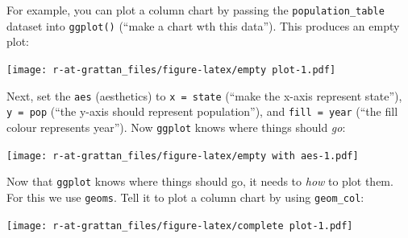 \documentclass[]{book}
\newenvironment{Shaded}{\begin{snugshade}}{\end{snugshade}}
\newcommand{\DataTypeTok}[1]{\textcolor[rgb]{0.13,0.29,0.53}{#1}}
\newcommand{\KeywordTok}[1]{\textcolor[rgb]{0.13,0.29,0.53}{\textbf{#1}}}
\newcommand{\NormalTok}[1]{#1}
\newcommand{\OperatorTok}[1]{\textcolor[rgb]{0.81,0.36,0.00}{\textbf{#1}}}
\newcommand{\StringTok}[1]{\textcolor[rgb]{0.31,0.60,0.02}{#1}}
\begin{document}
For example, you can plot a column chart by passing the \texttt{population\_table} dataset into \texttt{ggplot()} (``make a chart wth this data''). This produces an empty plot:

\begin{Shaded}
\end{Shaded}

\texttt{[image: r-at-grattan\_files/figure-latex/empty plot-1.pdf]}

Next, set the \texttt{aes} (aesthetics) to \texttt{x\ =\ state} (``make the x-axis represent state''), \texttt{y\ =\ pop} (``the y-axis should represent population''), and \texttt{fill\ =\ year} (``the fill colour represents year''). Now \texttt{ggplot} knows where things should \emph{go}:

\begin{Shaded}
\end{Shaded}

\texttt{[image: r-at-grattan\_files/figure-latex/empty with aes-1.pdf]}

Now that \texttt{ggplot} knows where things should go, it needs to \emph{how} to plot them. For this we use \texttt{geoms}. Tell it to plot a column chart by using \texttt{geom\_col}:

\begin{Shaded}
\end{Shaded}

\texttt{[image: r-at-grattan\_files/figure-latex/complete plot-1.pdf]}
\end{document}
